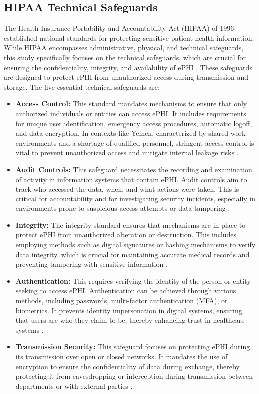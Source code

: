 \documentclass[12pt, a4paper, oneside]{report}
\begin{document}
	\subsection{HIPAA Technical Safeguards}
	The Health Insurance Portability and Accountability Act (HIPAA) of 1996 established national standards for protecting sensitive patient health information. While HIPAA encompasses administrative, physical, and technical safeguards, this study specifically focuses on the technical safeguards, which are crucial for ensuring the confidentiality, integrity, and availability of ePHI \cite{hhs2024hipaa}. These safeguards are designed to protect ePHI from unauthorized access during transmission and storage. The five essential technical safeguards are:
	\begin{itemize}
		\item \textbf{Access Control:} This standard mandates mechanisms to ensure that only authorized individuals or entities can access ePHI. It includes requirements for unique user identification, emergency access procedures, automatic logoff, and data encryption. In contexts like Yemen, characterized by shared work environments and a shortage of qualified personnel, stringent access control is vital to prevent unauthorized access and mitigate internal leakage risks \cite{abdulrab2021assessing}.
		\item \textbf{Audit Controls:} This safeguard necessitates the recording and examination of activity in information systems that contain ePHI. Audit controls aim to track who accessed the data, when, and what actions were taken. This is critical for accountability and for investigating security incidents, especially in environments prone to suspicious access attempts or data tampering \cite{al2023information}.
		\item \textbf{Integrity:} The integrity standard ensures that mechanisms are in place to protect ePHI from unauthorized alteration or destruction. This includes employing methods such as digital signatures or hashing mechanisms to verify data integrity, which is crucial for maintaining accurate medical records and preventing tampering with sensitive information \cite{nist2024sp80066r2}.
		\item \textbf{Authentication:} This requires verifying the identity of the person or entity seeking to access ePHI. Authentication can be achieved through various methods, including passwords, multi-factor authentication (MFA), or biometrics. It prevents identity impersonation in digital systems, ensuring that users are who they claim to be, thereby enhancing trust in healthcare systems \cite{hasegawa2024cybersecurity}.
		\item \textbf{Transmission Security:} This safeguard focuses on protecting ePHI during its transmission over open or closed networks. It mandates the use of encryption to ensure the confidentiality of data during exchange, thereby protecting it from eavesdropping or interception during transmission between departments or with external parties \cite{saad2025fuzzy}.	
	\end{itemize}
\end{document}
